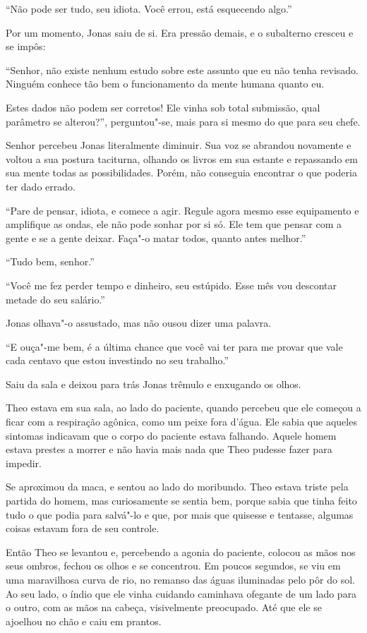 ``Não pode ser tudo, seu idiota. Você errou, está esquecendo algo.''

Por um momento, Jonas saiu de si. Era pressão demais, e o subalterno
cresceu e se impôs:

``Senhor, não existe nenhum estudo sobre este assunto que eu não tenha
revisado. Ninguém conhece tão bem o funcionamento da mente humana quanto
eu.

Estes dados não podem ser corretos! Ele vinha sob total submissão, qual
parâmetro se alterou?'', perguntou"-se, mais para si mesmo do que para seu
chefe.

Senhor  percebeu Jonas literalmente diminuir. Sua voz se abrandou
novamente e voltou a sua postura taciturna, olhando os livros em sua
estante e repassando em sua mente todas as possibilidades. Porém, não
conseguia encontrar o que poderia ter dado errado.

``Pare de pensar, idiota, e comece a agir. Regule agora mesmo esse
equipamento e amplifique as ondas, ele não pode sonhar por si só. Ele
tem que pensar com a gente e se a gente deixar. Faça"-o matar todos, quanto
antes melhor.''

``Tudo bem, senhor.''

``Você me fez perder tempo e dinheiro, seu estúpido. Esse mês vou
descontar metade do seu salário.''

Jonas olhava"-o assustado, mas não ousou dizer uma palavra.

``E ouça"-me bem, é a última chance que você vai ter para me provar que
vale cada centavo que estou investindo no seu trabalho.''

Saiu da sala e deixou para trás Jonas trêmulo e enxugando os olhos.

\asterisc


Theo estava em sua sala, ao lado do paciente, quando percebeu que ele
começou a ficar com a respiração agônica, como um peixe fora
d'água. Ele sabia que aqueles sintomas indicavam que o corpo do paciente
estava falhando. Aquele homem estava prestes a morrer e não havia mais nada que
Theo pudesse fazer para impedir.

Se aproximou da maca, e sentou ao lado do moribundo. Theo estava triste pela
partida do homem, mas curiosamente se sentia bem, porque sabia que tinha feito
tudo o que podia para salvá"-lo e que, por mais que quisesse e tentasse,
algumas coisas estavam fora de seu controle.

Então Theo se levantou e, percebendo a agonia do paciente, colocou as
mãos nos seus ombros, fechou os olhos e se concentrou. Em poucos
segundos, se viu em uma maravilhosa curva de rio, no remanso das águas
iluminadas pelo pôr do sol. Ao seu lado, o índio que ele vinha cuidando
caminhava ofegante de um lado para o outro, com as mãos na cabeça,
visivelmente preocupado. Até que ele se ajoelhou no chão e caiu em
prantos.

